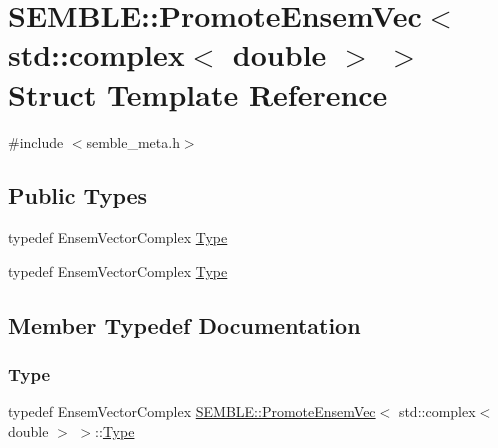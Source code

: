 \hypertarget{structSEMBLE_1_1PromoteEnsemVec_3_01std_1_1complex_3_01double_01_4_01_4}{}\section{S\+E\+M\+B\+LE\+:\+:Promote\+Ensem\+Vec$<$ std\+:\+:complex$<$ double $>$ $>$ Struct Template Reference}
\label{structSEMBLE_1_1PromoteEnsemVec_3_01std_1_1complex_3_01double_01_4_01_4}


{\ttfamily \#include $<$semble\+\_\+meta.\+h$>$}

\subsection*{Public Types}
\begin{DoxyCompactItemize}
\item 
typedef Ensem\+Vector\+Complex \mbox{\hyperlink{structSEMBLE_1_1PromoteEnsemVec_3_01std_1_1complex_3_01double_01_4_01_4_a515e76ac6ae88273e5df1c2ace1c7046}{Type}}
\item 
typedef Ensem\+Vector\+Complex \mbox{\hyperlink{structSEMBLE_1_1PromoteEnsemVec_3_01std_1_1complex_3_01double_01_4_01_4_a515e76ac6ae88273e5df1c2ace1c7046}{Type}}
\end{DoxyCompactItemize}


\subsection{Member Typedef Documentation}
\mbox{\label{structSEMBLE_1_1PromoteEnsemVec_3_01std_1_1complex_3_01double_01_4_01_4_a515e76ac6ae88273e5df1c2ace1c7046}} 
\subsubsection{\texorpdfstring{Type}{Type}\hspace{0.1cm}{\footnotesize\ttfamily [1/2]}}
{\footnotesize\ttfamily typedef Ensem\+Vector\+Complex \mbox{\hyperlink{structSEMBLE_1_1PromoteEnsemVec}{S\+E\+M\+B\+L\+E\+::\+Promote\+Ensem\+Vec}}$<$ std\+::complex$<$ double $>$ $>$\+::\mbox{\hyperlink{structSEMBLE_1_1PromoteEnsemVec_3_01std_1_1complex_3_01double_01_4_01_4_a515e76ac6ae88273e5df1c2ace1c7046}{Type}}}

